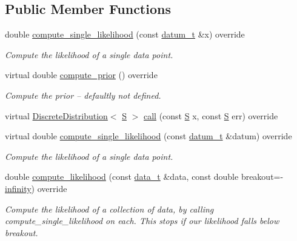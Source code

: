 \subsection*{Public Member Functions}
\begin{DoxyCompactItemize}
\item 
double \hyperlink{class_my_hypothesis_af23a45a03a28ea4f42438e70d47acacb}{compute\+\_\+single\+\_\+likelihood} (const \hyperlink{class_bayesable_a9f1a6c0cd7855550fa10b1a8f13a5867}{datum\+\_\+t} \&x) override
\begin{DoxyCompactList}\small\item\em Compute the likelihood of a single data point. \end{DoxyCompactList}\item 
virtual double \hyperlink{class_my_hypothesis_ab092094c5fc31730de4f40609220bb18}{compute\+\_\+prior} () override
\begin{DoxyCompactList}\small\item\em Compute the prior -- defaultly not defined. \end{DoxyCompactList}\item 
virtual \hyperlink{class_discrete_distribution}{Discrete\+Distribution}$<$ \hyperlink{_models_2_formal_language_theory-_complex_2_main_8cpp_a51c40915539205f0b5add30b0d68a4cb}{S} $>$ \hyperlink{class_my_hypothesis_a61391d3f1f6fbbe37663b22e2068ac90}{call} (const \hyperlink{_models_2_formal_language_theory-_complex_2_main_8cpp_a51c40915539205f0b5add30b0d68a4cb}{S} x, const \hyperlink{_models_2_formal_language_theory-_complex_2_main_8cpp_a51c40915539205f0b5add30b0d68a4cb}{S} err) override
\item 
virtual double \hyperlink{class_my_hypothesis_af2470b1e04711c06ee551deae15af4c1}{compute\+\_\+single\+\_\+likelihood} (const \hyperlink{class_bayesable_a9f1a6c0cd7855550fa10b1a8f13a5867}{datum\+\_\+t} \&datum) override
\begin{DoxyCompactList}\small\item\em Compute the likelihood of a single data point. \end{DoxyCompactList}\item 
double \hyperlink{class_my_hypothesis_a42d7d139cd23f30342e1393fd0873dd1}{compute\+\_\+likelihood} (const \hyperlink{class_bayesable_aa2788c4d7718c0a824e1d28c4c98f921}{data\+\_\+t} \&data, const double breakout=-\/\hyperlink{_numerics_8h_a1bb1e42ae1b40cad6e99da0aab8a5576}{infinity}) override
\begin{DoxyCompactList}\small\item\em Compute the likelihood of a collection of data, by calling compute\+\_\+single\+\_\+likelihood on each. This stops if our likelihood falls below breakout. \end{DoxyCompactList}\item 

\end{DoxyCompactItemize}
